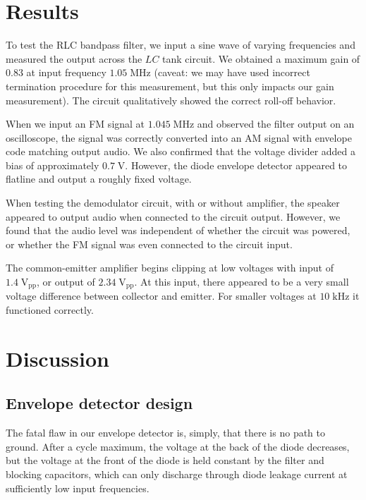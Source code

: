 \documentclass[11pt]{article}
\newcommand {\mt}{\mathrm}
\newcommand {\unit}[1]{\; \mt{#1}}
\begin{document}
\section{Results}

To test the RLC bandpass filter, we input a sine wave of varying frequencies
and measured the output across the $LC$ tank circuit.  We obtained a maximum
gain of $0.83$ at input frequency $1.05 \unit{MHz}$ (caveat: we may have used
incorrect termination procedure for this measurement, but this only impacts our
gain measurement).  The circuit qualitatively showed the correct roll-off
behavior.

When we input an FM signal at $1.045 \unit{MHz}$ and observed the
filter output on an oscilloscope, the signal was correctly converted into
an AM signal with envelope code matching output audio.  We also confirmed that
the voltage divider added a bias of approximately $0.7 \unit{V}$.
However, the diode envelope detector appeared to flatline and output a roughly
fixed voltage.

When testing the demodulator circuit, with or without amplifier, the speaker
appeared to output audio when connected to the circuit output.  However, we
found that the audio level was independent of whether the circuit was powered,
or whether the FM signal was even connected to the circuit input.

The common-emitter amplifier begins clipping at low voltages with input of
$1.4 \unit{V_{\mt{pp}}}$, or output of $2.34 \unit{V_{\mt{pp}}}$.  At this
input, there appeared to be a very small voltage difference between collector
and emitter. For smaller voltages at $10 \unit{kHz}$ it functioned correctly.

\section{Discussion}

\subsection{Envelope detector design}

The fatal flaw in our envelope detector is, simply, that there is no path to
ground. After a cycle maximum, the voltage at the back of the diode decreases,
but the voltage at the front of the diode is held constant by the filter and
blocking capacitors, which can only discharge through diode leakage current at
sufficiently low input frequencies.
\end{document}
